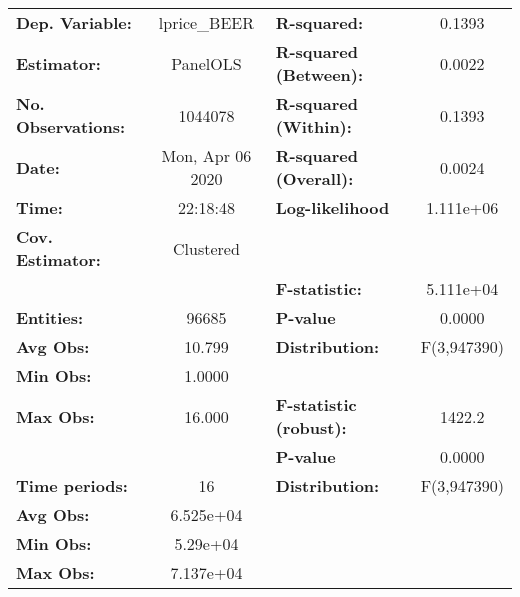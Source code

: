 \documentclass{report}
\begin{document}
\begin{center}
\begin{tabular}{lclc}
\toprule
\textbf{Dep. Variable:}       &    lprice\_BEER    & \textbf{  R-squared:         }   &      0.1393      \\
\textbf{Estimator:}           &      PanelOLS      & \textbf{  R-squared (Between):}  &      0.0022      \\
\textbf{No. Observations:}    &      1044078       & \textbf{  R-squared (Within):}   &      0.1393      \\
\textbf{Date:}                &  Mon, Apr 06 2020  & \textbf{  R-squared (Overall):}  &      0.0024      \\
\textbf{Time:}                &      22:18:48      & \textbf{  Log-likelihood     }   &    1.111e+06     \\
\textbf{Cov. Estimator:}      &     Clustered      & \textbf{                     }   &                  \\
\textbf{}                     &                    & \textbf{  F-statistic:       }   &    5.111e+04     \\
\textbf{Entities:}            &       96685        & \textbf{  P-value            }   &      0.0000      \\
\textbf{Avg Obs:}             &       10.799       & \textbf{  Distribution:      }   &   F(3,947390)    \\
\textbf{Min Obs:}             &       1.0000       & \textbf{                     }   &                  \\
\textbf{Max Obs:}             &       16.000       & \textbf{  F-statistic (robust):} &      1422.2      \\
\textbf{}                     &                    & \textbf{  P-value            }   &      0.0000      \\
\textbf{Time periods:}        &         16         & \textbf{  Distribution:      }   &   F(3,947390)    \\
\textbf{Avg Obs:}             &     6.525e+04      & \textbf{                     }   &                  \\
\textbf{Min Obs:}             &      5.29e+04      & \textbf{                     }   &                  \\
\textbf{Max Obs:}             &     7.137e+04      & \textbf{                     }   &                  \\
\bottomrule
\end{tabular}
\begin{tabular}{lcccccc}

\end{tabular}
\end{center}
\end{document}
